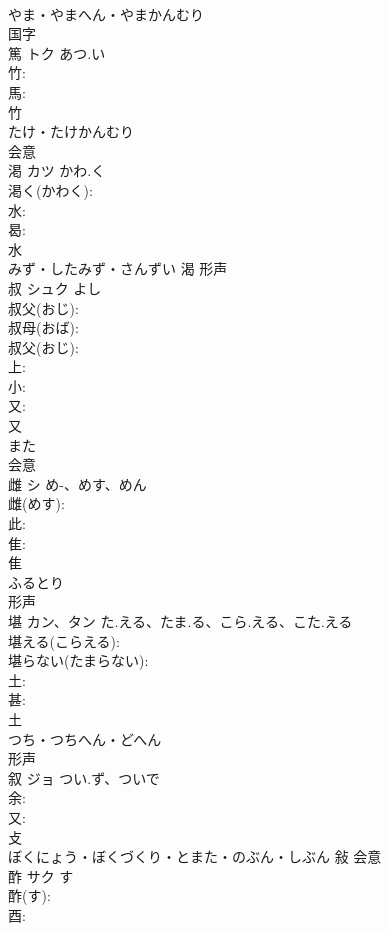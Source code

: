 \documentclass[8pt]{extreport}
\begin{document}
\begin{CJK}{UTF8}{min}
\\	やま・やまへん・やまかんむり	
\\	国字 
\\	篤	トク	あつ.い		
\\	竹: 
\\	馬: 
\\	竹	
\\	たけ・たけかんむり	
\\	会意 
\\	渇	カツ	かわ.く		
\\	渇く(かわく): 
\\	水: 
\\	曷: 
\\	水	
\\	みず・したみず・さんずい	渴	形声 
\\	叔	シュク		よし	
\\	叔父(おじ): 
\\	叔母(おば): 
\\	叔父(おじ): 
\\	上: 
\\	小: 
\\	又: 
\\	又	
\\	また	
\\	会意 
\\	雌	シ	め-、めす、めん		
\\	雌(めす): 
\\	此: 
\\	隹: 
\\	隹	
\\	ふるとり	
\\	形声 
\\	堪	カン、タン	た.える、たま.る、こら.える、こた.える		
\\	堪える(こらえる): 
\\	堪らない(たまらない): 
\\	土: 
\\	甚: 
\\	土	
\\	つち・つちへん・どへん	
\\	形声 
\\	叙	ジョ	つい.ず、ついで		
\\	余: 
\\	又: 
\\	攴	
\\	ぼくにょう・ぼくづくり・とまた・のぶん・しぶん	敍	会意 
\\	酢	サク	す		
\\	酢(す): 
\\	酉: 

\end{CJK}
\end{document}
